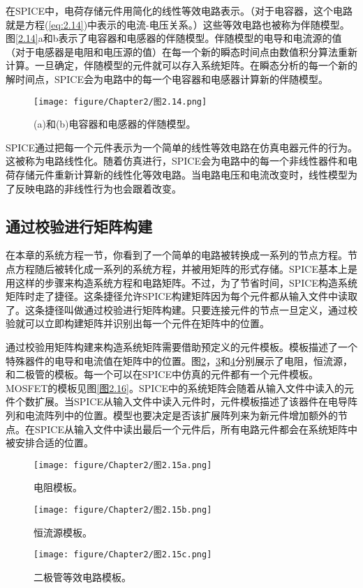 在SPICE中，电荷存储元件用简化的线性等效电路表示。（对于电容器，这个电路就是方程(\ref{eq:2.14})中表示的电流-电压关系。）这些等效电路也被称为伴随模型。图\ref{2.14}a和b表示了电容器和电感器的伴随模型。伴随模型的电导和电流源的值（对于电感器是电阻和电压源的值）在每一个新的瞬态时间点由数值积分算法重新计算。一旦确定，伴随模型的元件就可以存入系统矩阵。在瞬态分析的每一个新的解时间点，SPICE会为电路中的每一个电容器和电感器计算新的伴随模型。
\begin{figure}[htbp]
\small
    \centering
    \texttt{[image: figure/Chapter2/图2.14.png]}
    \caption{(a)和(b)电容器和电感器的伴随模型。}
    \label{图2.14}
\end{figure}

SPICE通过把每一个元件表示为一个简单的线性等效电路在仿真电器元件的行为。这被称为电路线性化。随着仿真进行，SPICE会为电路中的每一个非线性器件和电荷存储元件重新计算新的线性化等效电路。当电路电压和电流改变时，线性模型为了反映电路的非线性行为也会跟着改变。

\subsection{通过校验进行矩阵构建}
在本章的系统方程一节，你看到了一个简单的电路被转换成一系列的节点方程。节点方程随后被转化成一系列的系统方程，并被用矩阵的形式存储。SPICE基本上是用这样的步骤来构造系统方程和电路矩阵。不过，为了节省时间，SPICE构造系统矩阵时走了捷径。这条捷径允许SPICE构建矩阵因为每个元件都从输入文件中读取了。这条捷径叫做通过校验进行矩阵构建。只要连接元件的节点一旦定义，通过校验就可以立即构建矩阵并识别出每一个元件在矩阵中的位置\cite{Vlach1983}。

通过校验用矩阵构建来构造系统矩阵需要借助预定义的元件模板。模板描述了一个特殊器件的电导和电流值在矩阵中的位置。图\ref{图2.15a}，\ref{图2.15b}和\ref{图2.15c}分别展示了电阻，恒流源，和二极管的模板。每一个可以在SPICE中仿真的元件都有一个元件模板。MOSFET的模板见图\ref{图2.16}。SPICE中的系统矩阵会随着从输入文件中读入的元件个数扩展。当SPICE从输入文件中读入元件时，元件模板描述了该器件在电导阵列和电流阵列中的位置。模型也要决定是否该扩展阵列来为新元件增加额外的节点。在SPICE从输入文件中读出最后一个元件后，所有电路元件都会在系统矩阵中被安排合适的位置。
\begin{figure}[htbp]
\small
    \centering
    \texttt{[image: figure/Chapter2/图2.15a.png]}
    \caption{电阻模板。}
    \label{图2.15a}
\end{figure}
\begin{figure}[htbp]
\small
    \centering
    \texttt{[image: figure/Chapter2/图2.15b.png]}
    \caption{恒流源模板。}
    \label{图2.15b}
\end{figure}
\begin{figure}[htbp]
\small
    \centering
    \texttt{[image: figure/Chapter2/图2.15c.png]}
    \caption{二极管等效电路模板。}
    \label{图2.15c}
\end{figure}


